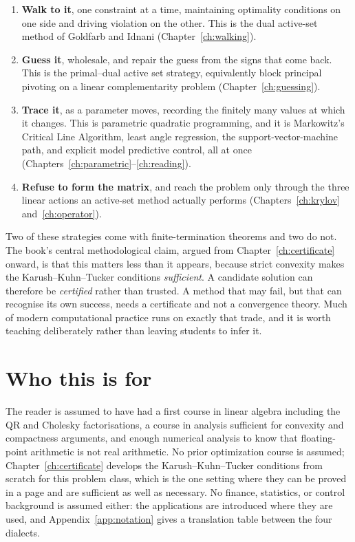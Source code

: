 \begin{enumerate}
\item \textbf{Walk to it}, one constraint at a time, maintaining optimality
      conditions on one side and driving violation on the other. This is the
      dual active-set method of Goldfarb and Idnani (Chapter~\ref{ch:walking}).
\item \textbf{Guess it}, wholesale, and repair the guess from the signs that
      come back. This is the primal--dual active set strategy, equivalently
      block principal pivoting on a linear complementarity problem
      (Chapter~\ref{ch:guessing}).
\item \textbf{Trace it}, as a parameter moves, recording the finitely many
      values at which it changes. This is parametric quadratic programming, and
      it is Markowitz's Critical Line Algorithm, least angle regression, the
      support-vector-machine path, and explicit model predictive control, all at
      once (Chapters~\ref{ch:parametric}--\ref{ch:reading}).
\item \textbf{Refuse to form the matrix}, and reach the problem only through the
      three linear actions an active-set method actually performs
      (Chapters~\ref{ch:krylov} and~\ref{ch:operator}).
\end{enumerate}

Two of these strategies come with finite-termination theorems and two do not.
The book's central methodological claim, argued from Chapter~\ref{ch:certificate}
onward, is that this matters less than it appears, because strict convexity makes
the Karush--Kuhn--Tucker conditions \emph{sufficient}. A candidate solution can
therefore be \emph{certified} rather than trusted. A method that may fail, but
that can recognise its own success, needs a certificate and not a convergence
theory. Much of modern computational practice runs on exactly that trade, and it
is worth teaching deliberately rather than leaving students to infer it.

\section*{Who this is for}

The reader is assumed to have had a first course in linear algebra including the
QR and Cholesky factorisations, a course in analysis sufficient for convexity and
compactness arguments, and enough numerical analysis to know that floating-point
arithmetic is not real arithmetic. No prior optimization course is assumed;
Chapter~\ref{ch:certificate} develops the Karush--Kuhn--Tucker conditions from
scratch for this problem class, which is the one setting where they can be proved
in a page and are sufficient as well as necessary. No finance, statistics, or
control background is assumed either: the applications are introduced where they
are used, and Appendix~\ref{app:notation} gives a translation table between the
four dialects.

